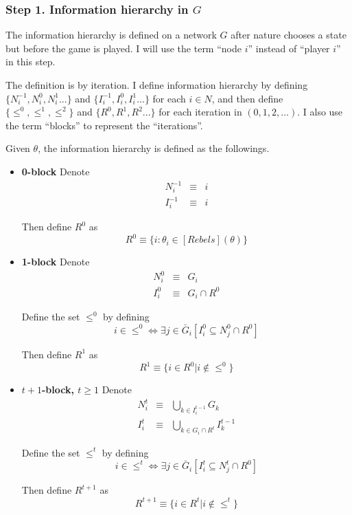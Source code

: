 \documentclass[12pt,letter]{article}
\theoremstyle{definition}
\theoremstyle{remark}
\theoremstyle{claim}
\begin{document}
\subsubsection{Step 1. Information hierarchy in $G$}

The information hierarchy is defined on a network $G$ after nature chooses a state but before the game is played. I will use the term ``node $i$'' instead of ``player $i$'' in this step. 

The definition is by iteration. I define information hierarchy by defining $\{N^{-1}_i,N^{0}_i, N^{1}_i...\}$ and $\{I^{-1}_i,I^{0}_i, I^{1}_i...\}$ for each $i\in N$, and then define $\{\leq^0, \leq^1, \leq^2\}$ and $\{R^0,R^{1}, R^{2}...\}$ for each iteration in $(0,1,2,...)$. I also use the term ``blocks'' to represent the ``iterations''. 

Given $\theta$, the information hierarchy is defined as the followings.
\begin{itemize}

\item \textbf{0-block}
Denote
\begin{eqnarray*}
N^{-1}_i &\equiv &  i \\
I^{-1}_i & \equiv & i
\end{eqnarray*}

Then define $R^0$ as 
\begin{equation}
R^0\equiv\{i:\theta_i\in[Rebels](\theta)\}
\end{equation}

\item \textbf{1-block}
Denote
\begin{eqnarray*}
N^0_i &\equiv &  G_i \\
I^0_i & \equiv & G_i\cap R^0
\end{eqnarray*}

Define the set $\leq^0$ by defining
\begin{equation}i\in \leq^0 \Leftrightarrow \exists  j\in \bar{G}_i [I^0_i\subseteq N^0_j\cap R^0]\end{equation}  

Then define $R^1$ as 
\begin{equation}
R^{1} \equiv \{i\in R^0|i\notin \leq^0\}
\end{equation}

\item \textbf{$t+1$-block, $t\geq 1$}
Denote
\begin{eqnarray*}
N^t_i & \equiv & \bigcup_{k\in I^{t-1}_i}G_k \\
I^t_i & \equiv & \bigcup_{k\in G_i\cap R^t}I^{t-1}_k
\end{eqnarray*}


Define the set $\leq^t$ by defining
\begin{equation}i\in \leq^t \Leftrightarrow \exists j\in \bar{G}_i[I^t_i\subseteq N^t_j\cap R^0]\end{equation}

Then define $R^{t+1}$ as 
\begin{equation}
R^{t+1} \equiv  \{i\in R^t|i\notin \leq^t\}
\end{equation}


\end{itemize}
\end{document}
